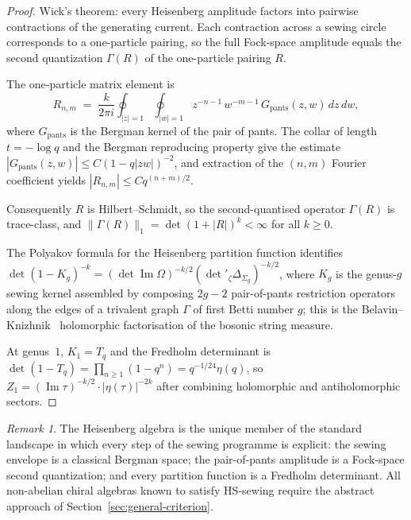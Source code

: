 \documentclass[11pt,reqno]{amsart}
\theoremstyle{definition}
\theoremstyle{remark}
\newtheorem{remark}[theorem]{Remark}
\numberwithin{equation}{section}
\begin{document}
\begin{proof}
Wick's theorem: every Heisenberg amplitude factors into
pairwise contractions of the generating current. Each
contraction across a sewing circle corresponds to a
one-particle pairing, so the full Fock-space amplitude
equals the second quantization $\Gamma(R)$ of the
one-particle pairing $R$.

The one-particle matrix element is
\[
R_{n,m}
\;=\;
\frac{k}{2\pi i}\oint_{|z| = 1}
\oint_{|w| = 1}
z^{-n-1}\, w^{-m-1}\, G_{\mathrm{pants}}(z, w)\, dz\, dw,
\]
where $G_{\mathrm{pants}}$ is the Bergman kernel of the pair
of pants. The collar of length $t = -\log q$ and the Bergman
reproducing property give the estimate
$|G_{\mathrm{pants}}(z, w)| \leq C (1 - q|zw|)^{-2}$,
and extraction of the $(n, m)$ Fourier coefficient yields
$|R_{n,m}| \leq C q^{(n+m)/2}$.

Consequently $R$ is Hilbert--Schmidt, so the second-quantised
operator $\Gamma(R)$ is trace-class, and
$\|\Gamma(R)\|_1 = \det(1 + |R|)^k < \infty$ for all $k \geq 0$.

The Polyakov formula for the Heisenberg partition function
identifies
$\det(1 - K_g)^{-k}
= (\det\operatorname{Im}\Omega)^{-k/2}
(\det{}'_\zeta \Delta_{\Sigma_g})^{-k/2}$,
where $K_g$ is the genus-$g$ sewing kernel assembled by
composing $2g - 2$ pair-of-pants restriction operators along
the edges of a trivalent graph $\Gamma$ of first Betti number
$g$; this is the Belavin--Knizhnik~\cite{BK86} holomorphic
factorisation of the bosonic string measure.

At genus~$1$, $K_1 = T_q$ and the Fredholm determinant is
$\det(1 - T_q) = \prod_{n \geq 1}(1 - q^n) = q^{-1/24}\eta(q)$,
so $Z_1 = (\operatorname{Im}\tau)^{-k/2}\cdot |\eta(\tau)|^{-2k}$
after combining holomorphic and antiholomorphic sectors.
\end{proof}

\begin{remark}
The Heisenberg algebra is the unique member of the standard
landscape in which every step of the sewing programme is
explicit: the sewing envelope is a classical Bergman space;
the pair-of-pants amplitude is a Fock-space second quantization;
and every partition function is a Fredholm determinant. All
non-abelian chiral algebras known to satisfy HS-sewing require
the abstract approach of
Section~\ref{sec:general-criterion}.
\end{remark}

\end{document}
